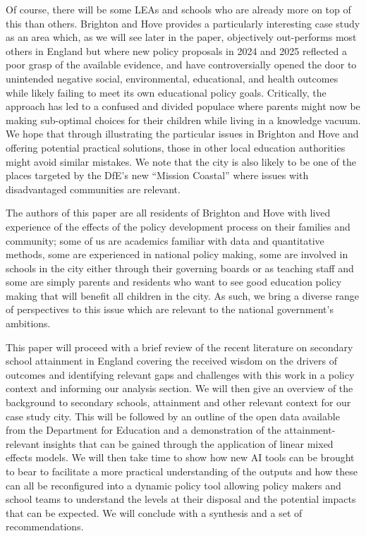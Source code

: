 \documentclass[
  11pt,
]{article}
\begin{document}
Of course, there will be some LEAs and schools who are already more on
top of this than others. Brighton and Hove provides a particularly
interesting case study as an area which, as we will see later in the
paper, objectively out-performs most others in England but where new
policy proposals in 2024 and 2025 reflected a poor grasp of the
available evidence, and have controversially opened the door to
unintended negative social, environmental, educational, and health
outcomes while likely failing to meet its own educational policy goals.
Critically, the approach has led to a confused and divided populace
where parents might now be making sub-optimal choices for their children
while living in a knowledge vacuum. We hope that through illustrating
the particular issues in Brighton and Hove and offering potential
practical solutions, those in other local education authorities might
avoid similar mistakes. We note that the city is also likely to be one
of the places targeted by the DfE's new ``Mission Coastal'' where issues
with disadvantaged communities are relevant.

The authors of this paper are all residents of Brighton and Hove with
lived experience of the effects of the policy development process on
their families and community; some of us are academics familiar with
data and quantitative methods, some are experienced in national policy
making, some are involved in schools in the city either through their
governing boards or as teaching staff and some are simply parents and
residents who want to see good education policy making that will benefit
all children in the city. As such, we bring a diverse range of
perspectives to this issue which are relevant to the national
government's ambitions.

This paper will proceed with a brief review of the recent literature on
secondary school attainment in England covering the received wisdom on
the drivers of outcomes and identifying relevant gaps and challenges
with this work in a policy context and informing our analysis section.
We will then give an overview of the background to secondary schools,
attainment and other relevant context for our case study city. This will
be followed by an outline of the open data available from the Department
for Education and a demonstration of the attainment-relevant insights
that can be gained through the application of linear mixed effects
models. We will then take time to show how new AI tools can be brought
to bear to facilitate a more practical understanding of the outputs and
how these can all be reconfigured into a dynamic policy tool allowing
policy makers and school teams to understand the levels at their
disposal and the potential impacts that can be expected. We will
conclude with a synthesis and a set of recommendations.
\end{document}

